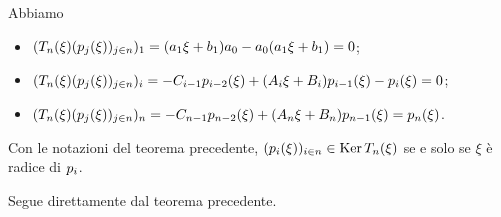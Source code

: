 \Proof Abbiamo
\begin{itemize}
	\item $(T_n(\xi) (p_j(\xi))_{j \in n})_1 = (a_1\xi + b_1)a_0 - a_0(a_1\xi + b_1) = 0$;
	\item $(T_n(\xi) (p_j(\xi))_{j \in n})_i = - C_{i - 1} p_{i - 2}(\xi) + (A_i \xi + B_i)p_{i - 1}(\xi) - p_i(\xi) = 0$;
	\item $(T_n(\xi) (p_j(\xi))_{j \in n})_n = - C_{n - 1} p_{n - 2}(\xi) + (A_n \xi + B_n)p_{n - 1}(\xi) = p_n(\xi)$. \EndProof
\end{itemize}
\begin{Corollary}
	Con le notazioni del teorema precedente, $(p_i(\xi))_{i \in n} \in \operatorname{Ker}{T_n(\xi)}$ se e solo se $\xi$ \`e radice di $p_i$.
\end{Corollary}
\Proof Segue direttamente dal teorema precedente. \EndProof

